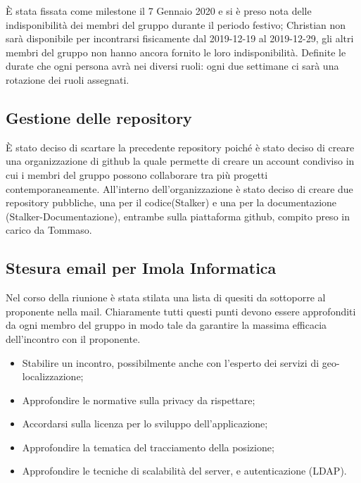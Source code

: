 È stata fissata come milestone il 7 Gennaio 2020 e si è preso nota delle indisponibilità dei membri del gruppo durante il periodo festivo; Christian non sarà disponibile per incontrarsi fisicamente dal 2019-12-19 al 2019-12-29, gli altri membri del gruppo non hanno ancora fornito le loro indisponibilità. 
Definite le durate che ogni persona avrà nei diversi ruoli: ogni due settimane ci sarà una rotazione dei ruoli assegnati. 

\subsection{Gestione delle repository}
È stato deciso di scartare la precedente repository poiché è stato deciso di creare una organizzazione di github la quale permette di creare un account condiviso in cui i membri del gruppo possono collaborare tra più progetti contemporaneamente.
All'interno dell'organizzazione è stato deciso di creare due repository pubbliche, una per il codice(Stalker) e una per la documentazione (Stalker-Documentazione), entrambe sulla piattaforma github, compito preso in carico da Tommaso. 

\subsection{Stesura email per Imola Informatica}
Nel corso della riunione è stata stilata una lista di quesiti da sottoporre al proponente nella mail. 
Chiaramente tutti questi punti devono essere approfonditi da ogni membro del gruppo in modo tale da garantire la massima efficacia dell'incontro con il proponente.
\begin{itemize}
\item Stabilire un incontro, possibilmente anche con l'esperto dei servizi di geo-localizzazione;
\item Approfondire le normative sulla privacy da rispettare;
\item Accordarsi sulla licenza per lo sviluppo dell'applicazione;
\item Approfondire la tematica del tracciamento della posizione;
\item Approfondire le tecniche di scalabilità del server, e autenticazione (LDAP).
\end{itemize} 

